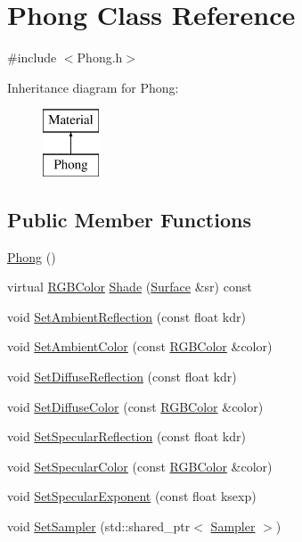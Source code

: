 \hypertarget{class_phong}{}\section{Phong Class Reference}
\label{class_phong}


{\ttfamily \#include $<$Phong.\+h$>$}

Inheritance diagram for Phong\+:\begin{figure}[H]
\begin{center}
\leavevmode
\includegraphics[height=2.000000cm]{class_phong}
\end{center}
\end{figure}
\subsection*{Public Member Functions}
\begin{DoxyCompactItemize}
\item 
\hyperlink{class_phong_a6b04845ec7a57cce73ee7d3355b0bf98}{Phong} ()
\item 
virtual \hyperlink{class_r_g_b_color}{R\+G\+B\+Color} \hyperlink{class_phong_a4ab7e1d4514c37abe47e18d627856dc8}{Shade} (\hyperlink{class_surface}{Surface} \&sr) const
\item 
void \hyperlink{group___materials_ga245b163a849cf378e84ed77620172f74}{Set\+Ambient\+Reflection} (const float kdr)
\item 
void \hyperlink{group___materials_ga7562b2e0139a3e2e93e61954d13c281f}{Set\+Ambient\+Color} (const \hyperlink{class_r_g_b_color}{R\+G\+B\+Color} \&color)
\item 
void \hyperlink{group___materials_ga7d9198210719a327b6c293955a9ecafe}{Set\+Diffuse\+Reflection} (const float kdr)
\item 
void \hyperlink{group___materials_ga54c0c1a1b40732588660aebbe01ce94f}{Set\+Diffuse\+Color} (const \hyperlink{class_r_g_b_color}{R\+G\+B\+Color} \&color)
\item 
void \hyperlink{group___materials_gaaa0823035fefb08e6f20e4af9c6f73d2}{Set\+Specular\+Reflection} (const float kdr)
\item 
void \hyperlink{group___materials_gaed8372d4e59cb7c1b781979c4ea9ee80}{Set\+Specular\+Color} (const \hyperlink{class_r_g_b_color}{R\+G\+B\+Color} \&color)
\item 
void \hyperlink{group___materials_ga167d70d514005d94a0bede7d7b12f372}{Set\+Specular\+Exponent} (const float ksexp)
\item 
void \hyperlink{group___materials_ga76b02c8e5a8dfff0a24c929b37a47c0c}{Set\+Sampler} (std\+::shared\+\_\+ptr$<$ \hyperlink{class_sampler}{Sampler} $>$)
\end{DoxyCompactItemize}


